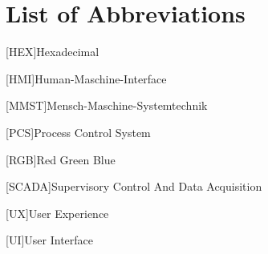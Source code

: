 \section*{List of Abbreviations}

\begin{acronym}[HEX]
	[HEX]{Hexadecimal}
\end{acronym}
\begin{acronym}[HMI]
	[HMI]{Human-Maschine-Interface}
\end{acronym}
\begin{acronym}[MMST]
	[MMST]{Mensch-Maschine-Systemtechnik}
\end{acronym}
\begin{acronym}[PCS]
	[PCS]{Process Control System}
\end{acronym}
\begin{acronym}[RGB]
	[RGB]{Red Green Blue}
\end{acronym}
\begin{acronym}[SCADA]
	[SCADA]{Supervisory Control And Data Acquisition}
\end{acronym}
\begin{acronym}[UX]
	[UX]{User Experience}
\end{acronym}
\begin{acronym}[UI]
	[UI]{User Interface}
\end{acronym}

